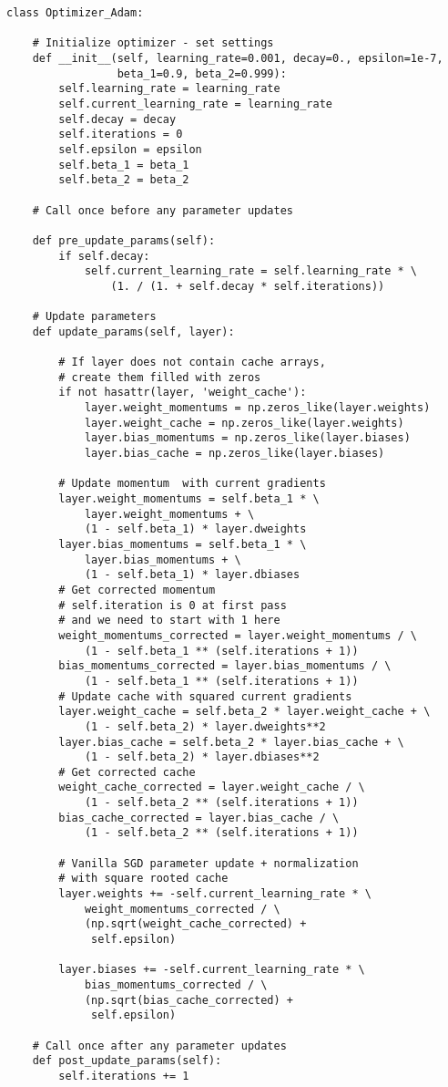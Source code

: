 \documentclass{article}
\begin{document}
\begin{lstlisting}
class Optimizer_Adam:

    # Initialize optimizer - set settings
    def __init__(self, learning_rate=0.001, decay=0., epsilon=1e-7,
                 beta_1=0.9, beta_2=0.999):
        self.learning_rate = learning_rate
        self.current_learning_rate = learning_rate
        self.decay = decay
        self.iterations = 0
        self.epsilon = epsilon
        self.beta_1 = beta_1
        self.beta_2 = beta_2

    # Call once before any parameter updates

    def pre_update_params(self):
        if self.decay:
            self.current_learning_rate = self.learning_rate * \
                (1. / (1. + self.decay * self.iterations))

    # Update parameters
    def update_params(self, layer):

        # If layer does not contain cache arrays,
        # create them filled with zeros
        if not hasattr(layer, 'weight_cache'):
            layer.weight_momentums = np.zeros_like(layer.weights)
            layer.weight_cache = np.zeros_like(layer.weights)
            layer.bias_momentums = np.zeros_like(layer.biases)
            layer.bias_cache = np.zeros_like(layer.biases)

        # Update momentum  with current gradients
        layer.weight_momentums = self.beta_1 * \
            layer.weight_momentums + \
            (1 - self.beta_1) * layer.dweights
        layer.bias_momentums = self.beta_1 * \
            layer.bias_momentums + \
            (1 - self.beta_1) * layer.dbiases
        # Get corrected momentum
        # self.iteration is 0 at first pass
        # and we need to start with 1 here
        weight_momentums_corrected = layer.weight_momentums / \
            (1 - self.beta_1 ** (self.iterations + 1))
        bias_momentums_corrected = layer.bias_momentums / \
            (1 - self.beta_1 ** (self.iterations + 1))
        # Update cache with squared current gradients
        layer.weight_cache = self.beta_2 * layer.weight_cache + \
            (1 - self.beta_2) * layer.dweights**2
        layer.bias_cache = self.beta_2 * layer.bias_cache + \
            (1 - self.beta_2) * layer.dbiases**2
        # Get corrected cache
        weight_cache_corrected = layer.weight_cache / \
            (1 - self.beta_2 ** (self.iterations + 1))
        bias_cache_corrected = layer.bias_cache / \
            (1 - self.beta_2 ** (self.iterations + 1))

        # Vanilla SGD parameter update + normalization
        # with square rooted cache
        layer.weights += -self.current_learning_rate * \
            weight_momentums_corrected / \
            (np.sqrt(weight_cache_corrected) +
             self.epsilon)

        layer.biases += -self.current_learning_rate * \
            bias_momentums_corrected / \
            (np.sqrt(bias_cache_corrected) +
             self.epsilon)

    # Call once after any parameter updates
    def post_update_params(self):
        self.iterations += 1
\end{lstlisting}
\pagebreak
\end{document}
